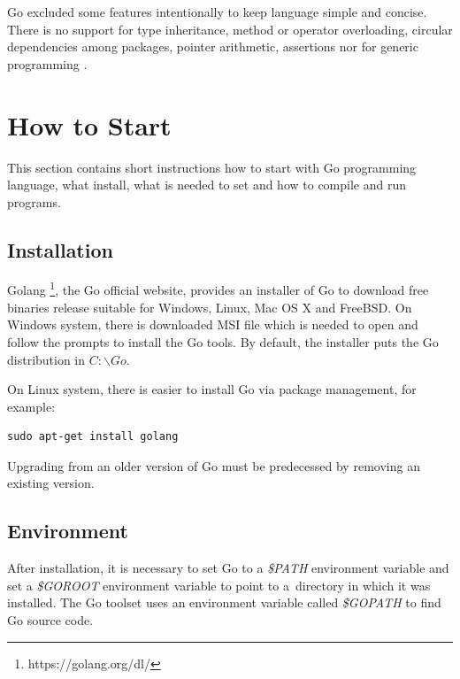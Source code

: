 \documentclass[
  oneside, 12pt, 
  printed, %
  notable,   %
  nolof,     %
  nolot,     %
]{fithesis3}
\begin{document}
Go excluded some features intentionally to keep language simple and concise. There is no 
support for type inheritance, method or operator overloading, circular dependencies among 
packages, pointer arithmetic, assertions nor for generic programming \cite{doxsey2016introducing, wiki-go}.

\section{How to Start}\label{howToStart}
This section contains short instructions how to start with Go programming language, what install, what is needed to set and how to compile and run programs.

\subsection{Installation}
Golang \footnote{https://golang.org/dl/}, the Go official website, provides an installer of Go to 
download free binaries release suitable for Windows, Linux, Mac OS X and FreeBSD. On Windows 
system, there is downloaded MSI file which is needed to open and follow the prompts to install the 
Go tools. By default, the installer puts the Go distribution in $C:\backslash Go$. 

On Linux system, there is easier to install Go via package management, for example:
\begin{lstlisting}
sudo apt-get install golang
\end{lstlisting}
Upgrading from an older version of Go must be predecessed by removing an existing version. 

\subsection{Environment}
After installation, it is necessary to set Go to a \textit{\$PATH} environment variable and set a 
\textit{\$GOROOT} environment variable to point to a~directory in which it was installed. The Go 
toolset uses an environment variable called \textit{\$GOPATH} to find Go source code. 
\end{document}
